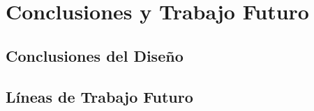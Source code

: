 \section{Conclusiones y Trabajo Futuro}
\label{sec:conclusiones}

\subsection{Conclusiones del Diseño}
\label{subsec:conclusiones_diseno}

\subsection{Líneas de Trabajo Futuro}
\label{subsec:trabajo_futuro}
